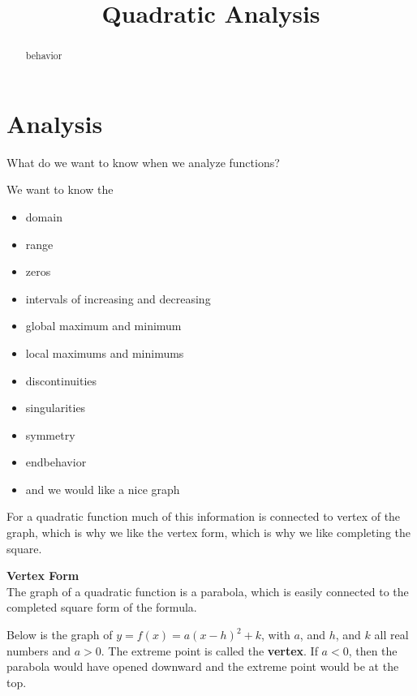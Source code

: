 \documentclass{ximera}
\title{Quadratic Analysis}
\begin{document}
\begin{abstract}
behavior
\end{abstract}
\maketitle





\section{Analysis}

What do we want to know when we analyze functions?

We want to know the 
\begin{itemize}
\item domain
\item range
\item zeros
\item intervals of increasing and decreasing
\item global maximum and minimum
\item local maximums and minimums
\item discontinuities
\item singularities
\item symmetry
\item endbehavior \\
\item and we would like a nice graph
\end{itemize}


For a quadratic function much of this information is connected to vertex of the graph, which is why we like the vertex form, which is why we like completing the square.







 \textbf{\textcolor{blue!75!black}{Vertex Form}} \\

The graph of a quadratic function is a parabola, which is easily connected to the completed square form of the formula.

Below is the graph of $y = f(x) = a (x - h)^2 + k$, with $a$, and $h$, and $k$ all real numbers and $a > 0$. The extreme point is called the \textbf{vertex}. If $a<0$, then the parabola would have opened downward and the extreme point would be at the top.
\end{document}

